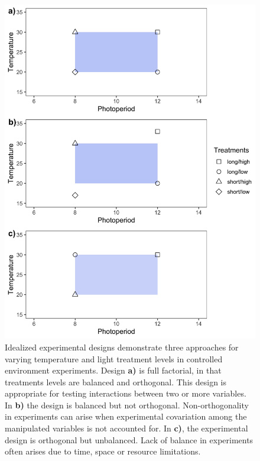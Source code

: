 \documentclass[11pt]{article}
\begin{document}
\begin{figure}[h!]
    \centering
 \includegraphics[width=.8\textwidth]{..//Plots/periodicity_figures/factorial.jpeg}
    \caption{Idealized experimental designs demonstrate three approaches for varying temperature and light treatment levels in controlled environment experiments. Design \textbf{a)} is full factorial, in that treatments levels are balanced and orthogonal. This design is appropriate for testing interactions between two or more variables. In \textbf{b)} the design is balanced but not orthogonal. Non-orthogonality in experiments can arise when experimental covariation among the manipulated variables is not accounted for. In \textbf{c)}, the experimental design is orthogonal but unbalanced. Lack of balance in experiments often arises due to time, space or resource limitations. }
    \label{fig:examp}
\end{figure}
\end{document}
